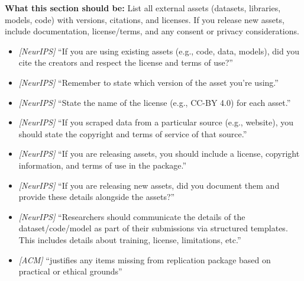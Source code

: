 \noindent\textbf{What this section should be:}
List all external assets (datasets, libraries, models, code) with versions, citations, and licenses. If you release new assets, include documentation, license/terms, and any consent or privacy considerations.
\begin{itemize}
  \item \textit{[NeurIPS]} ``If you are using existing assets (e.g., code, data, models), did you cite the creators and respect the license and terms of use?''
  \item \textit{[NeurIPS]} ``Remember to state which version of the asset you're using.''
  \item \textit{[NeurIPS]} ``State the name of the license (e.g., CC-BY 4.0) for each asset.''
  \item \textit{[NeurIPS]} ``If you scraped data from a particular source (e.g., website), you should state the copyright and terms of service of that source.''
  \item \textit{[NeurIPS]} ``If you are releasing assets, you should include a license, copyright information, and terms of use in the package.''
  \item \textit{[NeurIPS]} ``If you are releasing new assets, did you document them and provide these details alongside the assets?''
  \item \textit{[NeurIPS]} ``Researchers should communicate the details of the dataset/code/model as part of their submissions via structured templates. This includes details about training, license, limitations, etc.''
  \item \textit{[ACM]} ``justifies any items missing from replication package based on practical or ethical grounds''
\end{itemize}